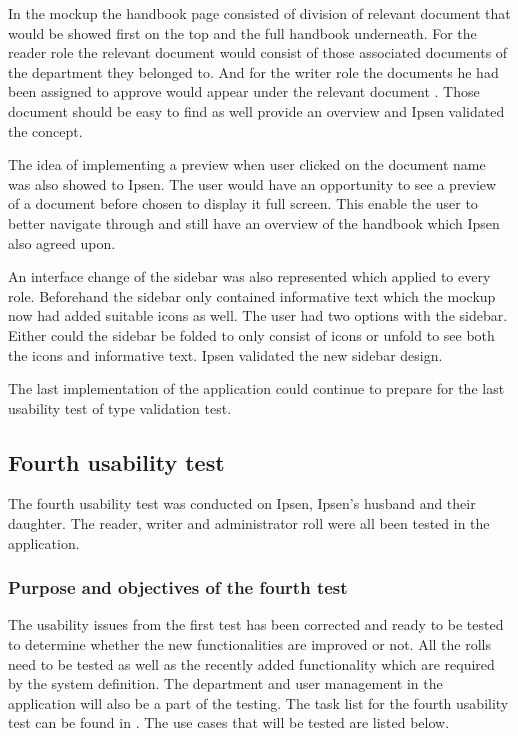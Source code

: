 In the mockup the handbook page consisted of division of relevant document that would be showed first on the top and the full handbook underneath.
For the reader role the relevant document would consist of those associated documents of the department they belonged to. 
And for the writer role the documents he had been assigned to approve would appear under the relevant document . 
Those document should be easy to find as well provide an overview and Ipsen validated the concept.

The idea of implementing a preview when user clicked on the document name was also showed to Ipsen. 
The user would have an opportunity to see a preview of a document before chosen to display it full screen. 
This enable the user to better navigate through and still have an overview of the handbook which Ipsen also agreed upon.

An interface change of the sidebar was also represented which applied to every role.
Beforehand the sidebar only contained informative text which the mockup now had added suitable icons as well. 
The user had two options with the sidebar.
Either could the sidebar be folded to only consist of icons or unfold to see both the icons and informative text. 
Ipsen validated the new sidebar design. 

The last implementation of the application could continue to prepare for the last usability test of type validation test. 

\subsection{Fourth usability test}\label{fourthtest}
The fourth usability test was conducted on Ipsen, Ipsen's husband and their daughter. 
The reader, writer and administrator roll were all been tested in the application. 

\subsubsection*{Purpose and objectives of the fourth test}
The usability issues from the first test has been corrected and ready to be tested to determine whether the new functionalities are improved or not. 
All the rolls need to be tested as well as the recently added functionality which are required by the system definition. 
The department and user management in the application will also be a part of the testing. The task list for the fourth usability test can be found in .
The use cases that will be tested are listed below.

